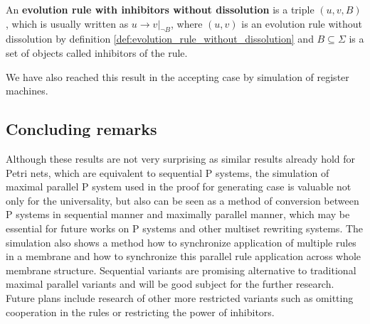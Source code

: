 \begin{definition}
  An {\bf evolution rule with inhibitors without dissolution} is a triple $(u,v,B)$, which is usually written as $u\rightarrow v|_{\neg B}$, where $(u,v)$ is an evolution rule without dissolution by definition \ref{def:evolution_rule_without_dissolution} and $B\subseteq\Sigma$ is a set of objects called inhibitors of the rule.
\end{definition}



We have also reached this result in the accepting case by simulation of  register machines.



\subsection{Concluding remarks} %
\label{sub:concluding_remarks_of_inhibitors}

Although these results are not very surprising as similar results already hold for Petri nets, which are equivalent to sequential P systems, the simulation of maximal parallel P system used in the proof for generating case is valuable not only for the universality, but also can be seen as a method of conversion between P systems in sequential manner and maximally parallel manner, which may be essential for future works on P systems and other multiset rewriting systems. The simulation also shows a method how to synchronize application of multiple rules in a membrane and how to synchronize this parallel rule application across whole membrane structure. Sequential variants are promising alternative to traditional maximal parallel variants and will be good subject for the further research. Future plans include research of other more restricted variants such as omitting cooperation in the rules or restricting the power of inhibitors.

